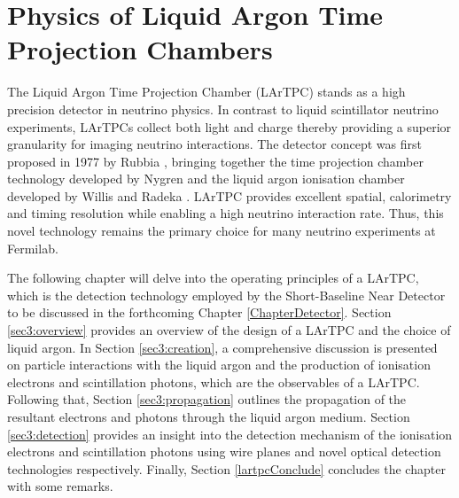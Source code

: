 \chapter{Physics of Liquid Argon Time Projection Chambers}
\label{Chapter3}
\ifpdf
    \graphicspath{{Chapter3/Figs/Raster/}{Chapter3/Figs/PDF/}{Chapter3/Figs/}}
\else
    \graphicspath{{Chapter3/Figs/Vector/}{Chapter3/Figs/}}
\fi


The Liquid Argon Time Projection Chamber (LArTPC) stands as a high precision detector in neutrino physics.
In contrast to liquid scintillator neutrino experiments, LArTPCs collect both light and charge thereby providing a superior granularity for imaging neutrino interactions.
The detector concept was first proposed in 1977 by Rubbia \cite{Rubbia}, bringing together the time projection chamber technology developed by Nygren \cite{Nygren1, Nygren2} and the liquid argon ionisation chamber developed by Willis and Radeka \cite{WillisRadeka}.
LArTPC provides excellent spatial, calorimetry and timing resolution while enabling a high neutrino interaction rate.
Thus, this novel technology remains the primary choice for many neutrino experiments at Fermilab.

The following chapter will delve into the operating principles of a LArTPC, which is the detection technology employed by the Short-Baseline Near Detector to be discussed in the forthcoming Chapter \ref{ChapterDetector}.
Section \ref{sec3:overview} provides an overview of the design of a LArTPC and the choice of liquid argon.
In Section \ref{sec3:creation}, a comprehensive discussion is presented on particle interactions with the liquid argon and the production of ionisation electrons and scintillation photons, which are the observables of a LArTPC.
Following that, Section \ref{sec3:propagation} outlines the propagation of the resultant electrons and photons through the liquid argon medium.
Section \ref{sec3:detection} provides an insight into the detection mechanism of the ionisation electrons and scintillation photons using wire planes and novel optical detection technologies respectively.
Finally, Section \ref{lartpcConclude} concludes the chapter with some remarks.

